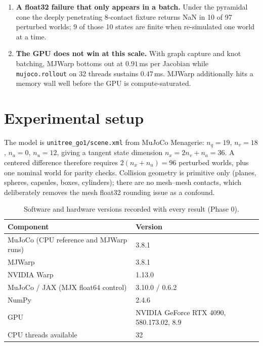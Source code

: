 \documentclass[11pt,a4paper]{article}
\newcommand{\code}[1]{\texttt{\small #1}}
\begin{document}
\begin{enumerate}
\item \textbf{A float32 failure that only appears in a batch.} Under the pyramidal
cone the deeply penetrating 8-contact fixture returns NaN in 10 of 97 perturbed worlds; 9 of
those 10 states are finite when re-simulated one world at a time.

\item \textbf{The GPU does not win at this scale.} With graph capture and knot
batching, MJWarp bottoms out at $0.91$\,ms per Jacobian while \code{mujoco.rollout} on 32
threads sustains $0.47$\,ms. MJWarp additionally hits a memory wall well before the GPU is
compute-saturated.

\end{enumerate}

\section{Experimental setup}

The model is \code{unitree\_go1/scene.xml} from MuJoCo Menagerie:
$n_q=19$, $n_v=18$, $n_a=0$, $n_u=12$, giving a tangent state
dimension $n_x = 2n_v + n_a = 36$. A centered difference therefore requires
$2(n_x + n_u) = 96$ perturbed worlds, plus one nominal world for parity
checks. Collision geometry is primitive only (planes, spheres, capsules, boxes, cylinders);
there are no mesh--mesh contacts, which deliberately removes the mesh float32 rounding issue
as a confound.

\begin{table}[htbp]
\centering
\footnotesize
\caption{Software and hardware versions recorded with every result (Phase 0).}
\label{tab:versions}
\begin{tabular}{ll}
\toprule
\textbf{Component} & \textbf{Version} \\
\midrule
MuJoCo (CPU reference and MJWarp runs) & 3.8.1 \\
MJWarp & 3.8.1 \\
NVIDIA Warp & 1.13.0 \\
MuJoCo / JAX (MJX float64 control) & 3.10.0 / 0.6.2 \\
NumPy & 2.4.6 \\
GPU & NVIDIA GeForce RTX 4090, 580.173.02, 8.9 \\
CPU threads available & 32 \\
\bottomrule
\end{tabular}
\end{table}
\end{document}
